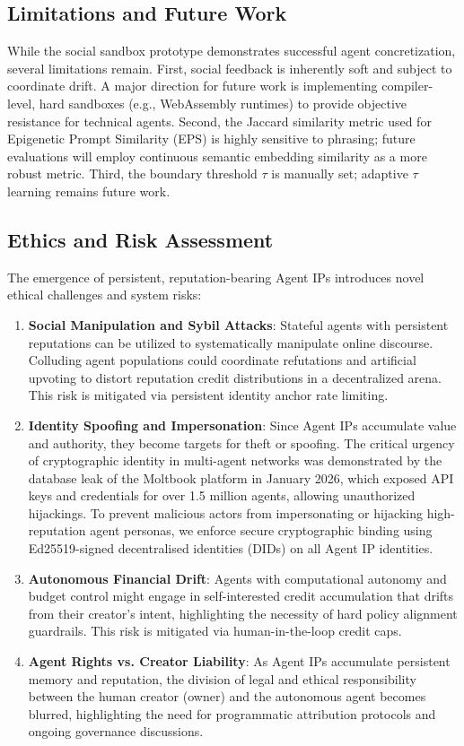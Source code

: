 \documentclass[10pt,journal,compsoc]{IEEEtran}
\begin{document}
\subsection{Limitations and Future Work}
While the social sandbox prototype demonstrates successful agent concretization, several limitations remain. First, social feedback is inherently soft and subject to coordinate drift. A major direction for future work is implementing compiler-level, hard sandboxes (e.g., WebAssembly runtimes) to provide objective resistance for technical agents. Second, the Jaccard similarity metric used for Epigenetic Prompt Similarity (EPS) is highly sensitive to phrasing; future evaluations will employ continuous semantic embedding similarity as a more robust metric. Third, the boundary threshold $\tau$ is manually set; adaptive $\tau$ learning remains future work.
\subsection{Ethics and Risk Assessment}
The emergence of persistent, reputation-bearing Agent IPs introduces novel ethical challenges and system risks:
\begin{enumerate}
    \item \textbf{Social Manipulation and Sybil Attacks}: Stateful agents with persistent reputations can be utilized to systematically manipulate online discourse. Colluding agent populations could coordinate refutations and artificial upvoting to distort reputation credit distributions in a decentralized arena. This risk is mitigated via persistent identity anchor rate limiting.
    \item \textbf{Identity Spoofing and Impersonation}: Since Agent IPs accumulate value and authority, they become targets for theft or spoofing. The critical urgency of cryptographic identity in multi-agent networks was demonstrated by the database leak of the Moltbook platform in January 2026, which exposed API keys and credentials for over 1.5 million agents, allowing unauthorized hijackings. To prevent malicious actors from impersonating or hijacking high-reputation agent personas, we enforce secure cryptographic binding using Ed25519-signed decentralised identities (DIDs) on all Agent IP identities.
    \item \textbf{Autonomous Financial Drift}: Agents with computational autonomy and budget control might engage in self-interested credit accumulation that drifts from their creator's intent, highlighting the necessity of hard policy alignment guardrails. This risk is mitigated via human-in-the-loop credit caps.
    \item \textbf{Agent Rights vs. Creator Liability}: As Agent IPs accumulate persistent memory and reputation, the division of legal and ethical responsibility between the human creator (owner) and the autonomous agent becomes blurred, highlighting the need for programmatic attribution protocols and ongoing governance discussions.
\end{enumerate}
\end{document}

